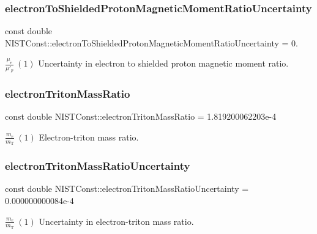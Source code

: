 \subsubsection{\texorpdfstring{electron\+To\+Shielded\+Proton\+Magnetic\+Moment\+Ratio\+Uncertainty}{electronToShieldedProtonMagneticMomentRatioUncertainty}}
{\footnotesize\ttfamily const double N\+I\+S\+T\+Const\+::electron\+To\+Shielded\+Proton\+Magnetic\+Moment\+Ratio\+Uncertainty = 0.}

$\frac{\mu_e}{\mu'_p} \ (1)$ Uncertainty in electron to shielded proton magnetic moment ratio. \mbox{\label{group___electron_gac9bfee1055b6fd5d3dabb3126318b52e}} 
\subsubsection{\texorpdfstring{electron\+Triton\+Mass\+Ratio}{electronTritonMassRatio}}
{\footnotesize\ttfamily const double N\+I\+S\+T\+Const\+::electron\+Triton\+Mass\+Ratio = 1.\+819200062203e-\/4}

$\frac{m_e}{m_\textrm{T}} \ (1)$ Electron-\/triton mass ratio. \mbox{\label{group___electron_ga424cccf2b6f72fd447313bac0994029e}} 
\subsubsection{\texorpdfstring{electron\+Triton\+Mass\+Ratio\+Uncertainty}{electronTritonMassRatioUncertainty}}
{\footnotesize\ttfamily const double N\+I\+S\+T\+Const\+::electron\+Triton\+Mass\+Ratio\+Uncertainty = 0.\+000000000084e-\/4}

$\frac{m_e}{m_\textrm{T}} \ (1)$ Uncertainty in electron-\/triton mass ratio. 